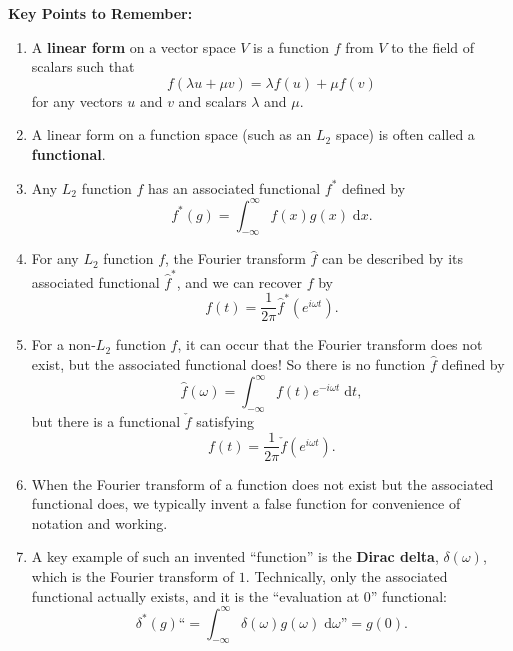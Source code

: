 \documentclass{article}
\newcommand{\diff}{\;\mathrm{d}}
\begin{document}
\clearpage




{\bf Key Points to Remember:}

\vspace{5mm}

\begin{enumerate}
	\item A \textbf{linear form} on a vector space $V$ is a function $f$ from $V$ to the field of scalars such that
		\[f(\lambda u+\mu v)=\lambda f(u)+\mu f(v)\]
		for any vectors $u$ and $v$ and scalars $\lambda$ and $\mu$.
	\item A linear form on a function space (such as an $L_2$ space) is often called a \textbf{functional}.
	\item Any $L_2$ function $f$ has an associated functional $f^*$ defined by
		\[f^*(g)=\int_{-\infty}^\infty f(x)g(x)\diff x.\]
	\item For any $L_2$ function $f$, the Fourier transform $\hat{f}$ can be described by its associated functional $\hat{f}^*$, and we can recover $f$ by
		\[f(t)=\frac{1}{2\pi}\hat{f}^*\left(e^{i\omega t}\right).\]
	\item For a non-$L_2$ function $f$, it can occur that the Fourier transform does not exist, but the associated functional does! So there is no function $\hat{f}$ defined by
		\[\hat{f}(\omega)=\int_{-\infty}^\infty f(t)e^{-i\omega t}\diff t,\]
		but there is a functional $\check{f}$ satisfying
		\[f(t)=\frac{1}{2\pi}\check{f}\left(e^{i\omega t}\right).\]
	\item When the Fourier transform of a function does not exist but the associated functional does, we typically invent a false function for convenience of notation and working.
	\item A key example of such an invented ``function'' is the \textbf{Dirac delta}, $\delta(\omega)$, which is the Fourier transform of $1$. Technically, only the associated functional actually exists, and it is the ``evaluation at 0'' functional:
		\[\delta^*(g)\text{``$=\int_{-\infty}^\infty \delta(\omega)g(\omega)\diff \omega$''} = g(0).\]
\end{enumerate}
\end{document}
